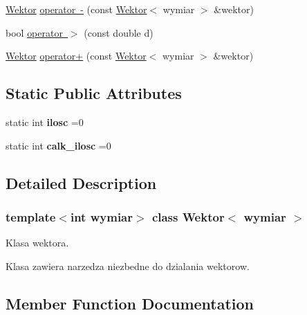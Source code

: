 \begin{DoxyCompactItemize}
\item 
\mbox{\hyperlink{class_wektor}{Wektor}} \mbox{\hyperlink{class_wektor_a07889863a7d2fe1b8ffe883bc6c9534f}{operator -\/}} (const \mbox{\hyperlink{class_wektor}{Wektor}}$<$ wymiar $>$ \&wektor)
\item 
bool \mbox{\hyperlink{class_wektor_a01f7399a7fe76b11fcb76be76f06432a}{operator $>$}} (const double d)
\item 
\mbox{\hyperlink{class_wektor}{Wektor}} \mbox{\hyperlink{class_wektor_a397fe70aad2b950bbf1509907bf21477}{operator+}} (const \mbox{\hyperlink{class_wektor}{Wektor}}$<$ wymiar $>$ \&wektor)
\end{DoxyCompactItemize}
\subsection*{Static Public Attributes}
\begin{DoxyCompactItemize}
\item 
\mbox{\label{class_wektor_aca9e29488d49814e1368ecb60d6d0c35}} 
static int {\bfseries ilosc} =0
\item 
\mbox{\label{class_wektor_a77bebd6bbeaaba3b55a38674511075b5}} 
static int {\bfseries calk\+\_\+ilosc} =0
\end{DoxyCompactItemize}


\subsection{Detailed Description}
\subsubsection*{template$<$int wymiar$>$\newline
class Wektor$<$ wymiar $>$}

Klasa wektora. 

Klasa zawiera narzedza niezbedne do dzialania wektorow. 

\subsection{Member Function Documentation}
\mbox{\label{class_wektor_af1ce23d4a271c8d4c31efd2dab493169}} 
